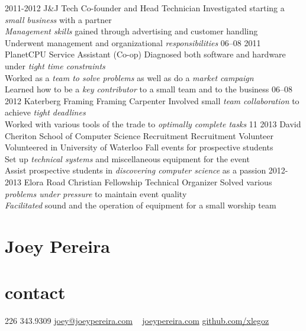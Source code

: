 \documentclass[]{friggeri-cv}
\newcommand{\imp}[1] {{\em #1}}
\begin{document}
\begin{entrylist}
  \entry
  	{2011-2012}
  	{J\&J Tech}
  	{Co-founder and Head Technician}
  	{Investigated starting a \imp{small business} with a partner \\
	\imp{Management skills} gained through advertising and customer handling \\
	Underwent management and organizational \imp{responsibilities}}
  \entry
    {06–08 2011}
    {PlanetCPU}
    {Service Assistant (Co-op)}
    {Diagnosed both software and hardware under \imp{tight time constraints} \\	Worked as a \imp{team to solve problems} as well as do a \imp{market campaign} \\
    Learned how to be a \imp{key contributor} to a small team and to the business}
  \entry
    {06–08 2012}
    {Katerberg Framing}
    {Framing Carpenter}
    {Involved small \imp{team collaboration} to achieve \imp{tight deadlines} \\
    Worked with various tools of the trade to \imp{optimally complete tasks}  
   }
  \entry
  	{11 2013}
  	{David Cheriton School of Computer Science Recruitment}
  	{Recruitment Volunteer}
	{Volunteered in University of Waterloo Fall events for prospective students \\
  	Set up \imp{technical systems} and miscellaneous equipment for the event \\
	Assist prospective students in \imp{discovering computer science} as a passion}
  \entry
  	{2012-2013}
  	{Elora Road Christian Fellowship}
  	{Technical Organizer}
	{Solved various \imp{problems under pressure} to maintain event quality\\
	\imp{Facilitated} sound and the operation of equipment for a small worship team}
  	

\end{entrylist}

\newpage

\begin{asidetwo}  	
	\section{Joey Pereira}
	\section{contact}
    226 343.9309
    \href{mailto:joey@joeypereira.com}{joey@joeypereira.com}
    ~
    \href{http://joeypereira.com}{joeypereira.com}
    \href{http://www.github.com/xlegoz}{github.com/xlegoz}
\end{asidetwo}
\end{document}
